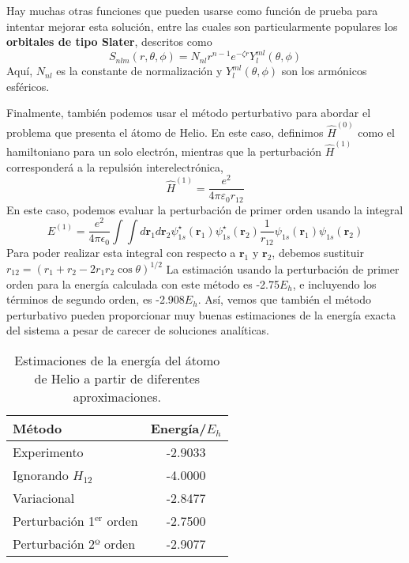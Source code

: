 \documentclass{tufte-handout}
\begin{document}
Hay muchas otras funciones que pueden usarse como función de
prueba para intentar mejorar esta solución, entre las cuales
son particularmente populares los \textbf{orbitales de tipo Slater},
descritos como
\begin{equation}
    S_{nlm}(r, \theta, \phi)=N_{nl}r^{n-1}e^{-\zeta r}Y_l^{ml}(\theta, \phi)
\end{equation}
Aquí, $N_{nl}$ es la constante de normalización y $Y_l^{ml}(\theta, \phi)$ son los armónicos esféricos.

Finalmente, también podemos usar el método perturbativo para
abordar el problema que presenta el átomo de Helio. En este caso, 
definimos $\hat{H}^{(0)}$ como el hamiltoniano para un solo electrón, 
mientras que la perturbación $\hat{H}^{(1)}$ corresponderá a la
repulsión interelectrónica, 
\begin{equation}
\hat{H}^{(1)}=\frac{e^2}{4\pi \varepsilon_0r_{12}}
\end{equation}
En este caso, podemos evaluar la perturbación de primer orden usando
la integral
\begin{equation}
E^{(1)}=\frac{e^2}{4\pi \epsilon_0}\int\int d\mathbf{r}_1d\mathbf{r}_2\psi_{1s}^\star(\mathbf{r}_1)\psi_{1s}^\star(\mathbf{r}_2)\frac{1}{r_{12}}\psi_{1s}(\mathbf{r}_1)\psi_{1s}(\mathbf{r}_2)
\end{equation}
Para poder realizar esta integral con 
respecto a $\mathbf{r}_1$ y $\mathbf{r}_2$, debemos sustituir 
$r_{12}=(r_1+r_2-2r_1r_2\cos\theta)^{1/2}$
La estimación usando la perturbación de primer orden para la energía
calculada con este método es -2.75$E_h$, e incluyendo los 
términos de segundo orden, es -2.908$E_h$. Así, vemos que también 
el método perturbativo pueden proporcionar 
muy buenas estimaciones de la energía exacta del sistema a pesar
de carecer de soluciones analíticas.

\begin{table}[]
    \centering
    \begin{tabular}{ | l | c |}
    \hline
        \textbf{Método} & \textbf{Energía/$E_h$} \\
         \hline
         Experimento &  -2.9033 \\
         Ignorando $H_{12}$ & -4.0000 \\
         Variacional & -2.8477 \\
         Perturbación 1$^\mathrm{er}$ orden & -2.7500 \\
         Perturbación 2º orden & -2.9077 \\
     \hline    
    \end{tabular}
    \caption{Estimaciones de la energía del átomo de 
    Helio a partir de  diferentes aproximaciones.}
    \label{tab:my_label}
\end{table}
\end{document}
